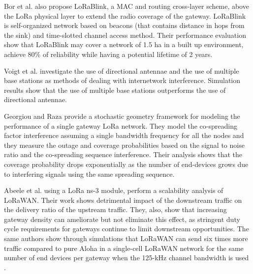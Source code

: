 Bor et al.
\cite{bor_lora_nodate} also propose LoRaBlink,
	a MAC and routing cross-layer scheme,
	above the LoRa physical layer to extend the radio coverage of the gateway.
LoRaBlink is self-organized network based on beacons (that contains distance in hops from the sink) and time-slotted channel access method.
Their performance evaluation show that LoRaBlink may cover a network of 1.5 ha in a built up environment,
	achieve 80\% of
reliability while having a potential lifetime of 2 years.

Voigt et al.
\cite{voigt_mitigating_2016} investigate the use of directional antennae and the use of multiple base stations as methods of dealing with internetwork interference.
Simulation results show that the use of multiple base stations outperforms the use of directional antennae.

Georgiou and Raza \cite{georgiou_low_2017} provide a stochastic geometry framework for modeling the performance of a single gateway LoRa network.
They model the co-spreading factor interference assuming a single bandwidth frequency for all the nodes and they measure the outage and coverage probabilities based on the signal to noise ratio and the co-spreading sequence interference.
Their analysis shows that the coverage probability drops exponentially as the number of end-devices grows due to interfering signals using the same spreading sequence.

Abeele et al.
\cite{abeele_scalability_2017} using a LoRa ns-3 module,
	perform a scalability analysis of LoRaWAN.
Their work shows detrimental impact of the downstream traffic on the delivery ratio of the upstream traffic.
They,
	also,
	show that increasing gateway density can ameliorate but not eliminate this effect,
	as stringent duty cycle requirements for gateways continue to limit downstream opportunities.
The same authors show through simulations that LoRaWAN can send six times more traffic compared to pure Aloha in a single-cell LoRaWAN network for the same number of end devices per gateway when the 125-kHz channel bandwidth is used \cite{jetmir_haxhibeqiri_lora_2017}.


